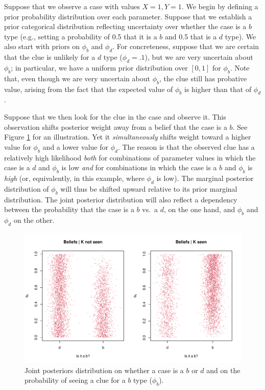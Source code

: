 \documentclass[
  12pt,
]{book}
\begin{document}
Suppose that we observe a case with values \(X=1, Y=1\). We begin by defining a prior probability distribution over each parameter. Suppose that we establish a prior categorical distribution reflecting uncertainty over whether the case is a \(b\) type (e.g., setting a probability of 0.5 that it is a \(b\) and 0.5 that is a \(d\) type). We also start with priors on \(\phi_b\) and \(\phi_d\). For concreteness, suppose that we are certain that the clue is unlikely for a \(d\) type (\(\phi_d=.1\)), but we are very uncertain about \(\phi_b\); in particular, we have a uniform prior distribution over \([0,1]\) for \(\phi_b\). Note that, even though we are very uncertain about \(\phi_b\), the clue still has probative value, arising from the fact that the expected value of \(\phi_b\) is higher than that of \(\phi_d\).

Suppose that we then look for the clue in the case and observe it. This observation shifts posterior weight away from a belief that the case is a \(b\). See Figure \ref{fig:correlation} for an illustration. Yet it \emph{simultaneously} shifts weight toward a higher value for \(\phi_b\) and a lower value for \(\phi_d\). The reason is that the observed clue has a relatively high likelihood \emph{both} for combinations of parameter values in which the case is a \(d\) and \(\phi_b\) is low \emph{and} for combinations in which the case is a \(b\) and \(\phi_b\) is \emph{high} (or, equivalently, in this example, where \(\phi_d\) is low). The marginal posterior distribution of \(\phi_b\) will thus be shifted upward relative to its prior marginal distribution. The joint posterior distribution will also reflect a dependency between the probability that the case is a \(b\) vs.~a \(d\), on the one hand, and \(\phi_b\) and \(\phi_d\) on the other.

\begin{figure}
\centering
\includegraphics{ii_files/figure-latex/correlation-1.pdf}
\caption{\label{fig:correlation}\label{fig:correlation} Joint posteriors distribution on whether a case is a \(b\) or \(d\) and on the probability of seeing a clue for a \(b\) type (\(\phi_b\)).}
\end{figure}
\end{document}
